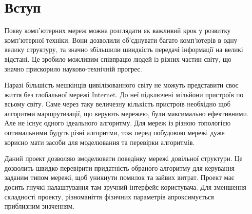 \documentclass[a4paper, ukrainian, utf8, simple, hpadding=8mm]{eskdtext}
\begin{document}
\maketitle




\newpage
\tableofcontents
\newpage
\setcounter{page}{1}

\section{Вступ}
Появу комп'ютерних мереж можна розглядати як важливий крок у розвитку
комп'ютерної техніки. Вони дозволили об'єднувати багато комп'ютерів в
одну велику структуру, та значно збільшили швидкість передачі інформації
на великі відстані. Це зробило можливим співпрацю людей із різних частин 
світу, що значно прискорило науково-технічній прогрес.

Наразі більшість мешкінців цивілізованного світу не можуть представити 
своє життя без глобальної мережі Internet. До неї підключені мільйони 
пристроїв по всьому світу. Саме через таку величезну кількість пристроїв 
необхідно щоб алгоритми маршрутизації, що керують мережею, були максимально
ефективними. Але не існує одного ідеального алгоритму. Для мереж із різною 
топологією оптимальними будуть різні алгоритми, тож перед побудовою мережі
дуже корисно мати засоби для моделювання та перевірки алгоритмів.

Даний проект дозволяю змоделювати поведінку мережі довільної структури.
Це дозволить швидко перевірити придатність обраного алгоритму для керування
заданим типом мережі, щоб уникнути помилок та зайвих витрат. Проект має 
досить гнучкі налаштування там зручний інтерфейс користувача. Для зменшення
складності проекту, різноманіття фізичних параметрів апроксимується приблизним
значенням.


\newpage
\printbibliography
\end{document}
